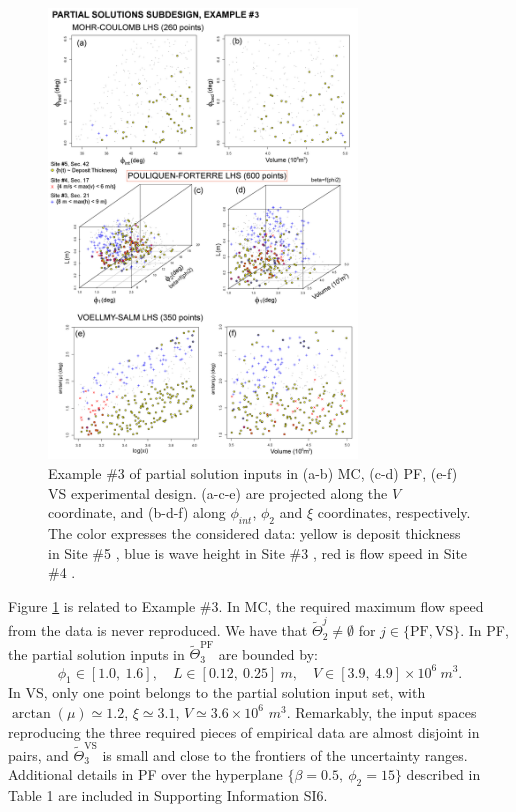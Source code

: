 \documentclass[nhess, manuscript]{copernicus}
\begin{document}
\begin{figure}[H]
\centering
\includegraphics[width=0.73\textwidth]{Fig11_PF.png}
\caption{Example \#3 of partial solution inputs in (a-b) MC, (c-d) PF, (e-f) VS experimental design. (a-c-e) are projected along the $V$ coordinate, and (b-d-f) along $\phi_{int}$, $\phi_2$ and $\xi$ coordinates, respectively. The color expresses the considered data: yellow is deposit thickness in Site \#5 \citep{Saucedo2008}, blue is wave height in Site \#3 \citep{PonceSegura1983}, red is flow speed in Site \#4 \citep{Pierson1985}.}
\label{Fig11a}
\end{figure}

Figure \ref{Fig11a} is related to Example \#3. In MC, the required maximum flow speed from the data is never reproduced. We have that $\tilde\Theta_2^j\neq\emptyset$ for $j\in\{\textrm{PF}, \textrm{VS}\}$. In PF, the partial solution inputs in $\tilde\Theta_3^{\textrm{PF}}$ are bounded by:
$$\phi_1 \in [1.0,\ 1.6],\quad L \in [0.12,\ 0.25]\ m,\quad V \in [3.9,\ 4.9] \times 10^6\ m^3.$$
In VS, only one point belongs to the partial solution input set, with $\arctan(\mu) \simeq 1.2$, $\xi \simeq 3.1$, $V \simeq 3.6 \times 10^6$ $m^3$. Remarkably, the input spaces reproducing the three required pieces of empirical data are almost disjoint in pairs, and $\tilde\Theta_3^{\textrm{VS}}$ is small and close to the frontiers of the uncertainty ranges. Additional details in PF over the hyperplane $\{\beta=0.5,\ \phi_2=15\}$ described in Table 1 are included in Supporting Information SI6.
\end{document}
